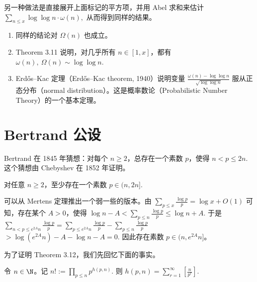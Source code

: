 \begin{remark}
	另一种做法是直接展开上面标记的平方项，并用 Abel 求和来估计
	\(\textstyle \sum_{n\leq\allowbreak{} x}\log\log n\cdot \omega(n),\allowbreak{}\)
	从而得到同样的结果。
\end{remark}

\begin{remark}
	\begin{enumerate}[label=(\alph*)]
		\item 同样的结论对 $\Omega(n)$ 也成立。
		\item Theorem 3.11 说明，对几乎所有 $n\in[1,x]$，都有
		\(\textstyle \omega(n),\allowbreak{}\ \Omega(n)\sim\allowbreak{} \log\log n.\)
		\item Erdős--Kac 定理（Erdős--Kac theorem, 1940）说明变量
		\(\textstyle \frac{\omega(n)-\log\log n}{\sqrt{\log\log n}}\)
		服从正态分布（normal distribution）。这是概率数论（Probabilistic Number Theory）的一个基本定理。
	\end{enumerate}
\end{remark}

\section{Bertrand 公设}

Bertrand 在 1845 年猜想：对每个 $n\geq 2$，总存在一个素数 $p$，使得
\(\textstyle n<p\leq\allowbreak{} 2n.\)
这个猜想由 Chebyshev 在 1852 年证明。

\begin{theorem}
	对任意 $n\geq 2$，至少存在一个素数
	\(\textstyle p\in(n,\allowbreak{}2n].\)
\end{theorem}

\begin{remark}
	可以从 Mertens 定理推出一个弱一些的版本。由
	\(\textstyle \sum_{p\leq\allowbreak{} x}\frac{\log p}{p}=\allowbreak{}\log x+\allowbreak{}O(1)\)
	可知，存在某个 $A>0$，使得
	\(\textstyle \log n-A < \sum_{p\leq\allowbreak{} n}\frac{\log p}{p} \leq\allowbreak{} \log n+\allowbreak{}A.\)
	于是
	\(\textstyle \sum_{n<p\leq\allowbreak{} e^{2A}n}\frac{\log p}{p} =\allowbreak{} \sum_{p\leq\allowbreak{} e^{2A}n}\frac{\log p}{p} - \sum_{p\leq\allowbreak{} n}\frac{\log p}{p}\) \(\textstyle > \log(e^{2A}n)-A-\log n-A =\allowbreak{} 0.\)
	因此存在素数 $p\in(n,e^{2A}n]$。
\end{remark}

为了证明 Theorem 3.12，我们先回忆下面的事实。

\begin{lemma}[原文 Lemma 3.13]
	令 $n\in\N$。记
	\(\textstyle n!:=\allowbreak{}\prod_{p\leq\allowbreak{} n}p^{h(p,\allowbreak{}n)}.\)
	则
	\(\textstyle h(p,\allowbreak{}n)=\allowbreak{}\sum_{r=\allowbreak{}1}^{\infty}\left[\frac{n}{p^r}\right].\)
\end{lemma}

